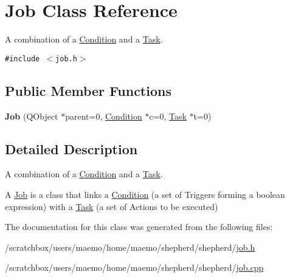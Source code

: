 \hypertarget{class_job}{
\section{Job Class Reference}
\label{class_job}
}
A combination of a \hyperlink{class_condition}{Condition} and a \hyperlink{class_task}{Task}.  


{\tt \#include $<$job.h$>$}

\subsection*{Public Member Functions}
\begin{CompactItemize}
\item 
\hypertarget{class_job_862e196ccacf0bcbaf7a6db3d3d86492}{
\textbf{Job} (QObject $\ast$parent=0, \hyperlink{class_condition}{Condition} $\ast$c=0, \hyperlink{class_task}{Task} $\ast$t=0)}
\label{class_job_862e196ccacf0bcbaf7a6db3d3d86492}

\end{CompactItemize}


\subsection{Detailed Description}
A combination of a \hyperlink{class_condition}{Condition} and a \hyperlink{class_task}{Task}. 

A \hyperlink{class_job}{Job} is a class that links a \hyperlink{class_condition}{Condition} (a set of Triggers forming a boolean expression) with a \hyperlink{class_task}{Task} (a set of Actions to be executed) 

The documentation for this class was generated from the following files:\begin{CompactItemize}
\item 
/scratchbox/users/maemo/home/maemo/shepherd/shepherd/\hyperlink{job_8h}{job.h}\item 
/scratchbox/users/maemo/home/maemo/shepherd/shepherd/\hyperlink{job_8cpp}{job.cpp}\end{CompactItemize}
